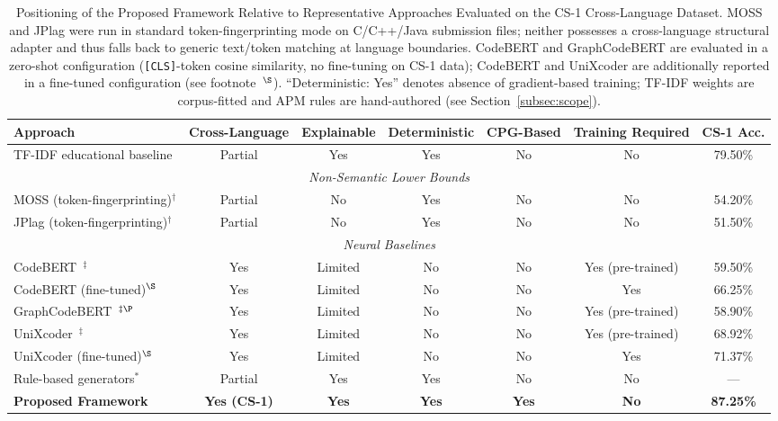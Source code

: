 \begin{table}[t]
\caption{Positioning of the Proposed Framework Relative to Representative Approaches
Evaluated on the CS-1 Cross-Language Dataset. MOSS and JPlag were run in standard
token-fingerprinting mode on C/C++/Java submission files; neither possesses a
cross-language structural adapter and thus falls back to generic text/token matching
at language boundaries. CodeBERT and GraphCodeBERT are evaluated in a zero-shot
configuration (\texttt{[CLS]}-token cosine similarity, no fine-tuning on CS-1 data);
CodeBERT and UniXcoder are additionally reported in a fine-tuned configuration
(see footnote~$^{\S}$). ``Deterministic: Yes'' denotes absence of gradient-based
training; TF-IDF weights are corpus-fitted and APM rules are hand-authored (see Section~\ref{subsec:scope}).}

\label{tab:method_comparison}
\centering
\begin{tabular}{|l|c|c|c|c|c|c|}
\hline
\textbf{Approach} & \textbf{Cross-Language} & \textbf{Explainable} & \textbf{Deterministic} & \textbf{CPG-Based} & \textbf{Training Required} & \textbf{CS-1 Acc.} \\
\hline
TF-IDF educational baseline & Partial & Yes & Yes & No & No & 79.50\% \\
\hline
\multicolumn{7}{|c|}{\cellcolor{gray!15}\textit{Non-Semantic Lower Bounds}} \\
\hline
MOSS (token-fingerprinting)$^{\dagger}$ & Partial & No & Yes & No & No & 54.20\% \\
JPlag (token-fingerprinting)$^{\dagger}$ & Partial & No & Yes & No & No & 51.50\% \\
\hline
\multicolumn{7}{|c|}{\cellcolor{gray!15}\textit{Neural Baselines}} \\
\hline
CodeBERT~\cite{ref_codebert}$^{\ddagger}$ & Yes & Limited & No & No & Yes (pre-trained) & 59.50\% \\
CodeBERT (fine-tuned)$^{\S}$ & Yes & Limited & No & No & Yes & 66.25\% \\
GraphCodeBERT~\cite{ref_graphcodebert}$^{\ddagger\P}$ & Yes & Limited & No & No & Yes (pre-trained) & 58.90\% \\
UniXcoder~\cite{ref_unixcoder}$^{\ddagger}$ & Yes & Limited & No & No & Yes (pre-trained) & 68.92\% \\
UniXcoder (fine-tuned)$^{\S}$ & Yes & Limited & No & No & Yes & 71.37\% \\
\hline
Rule-based generators$^{*}$ & Partial & Yes & Yes & No & No & --- \\
\textbf{Proposed Framework} & \textbf{Yes (CS-1)} & \textbf{Yes} & \textbf{Yes} & \textbf{Yes} & \textbf{No} & \textbf{87.25\%} \\

\end{tabular}
\end{table}
